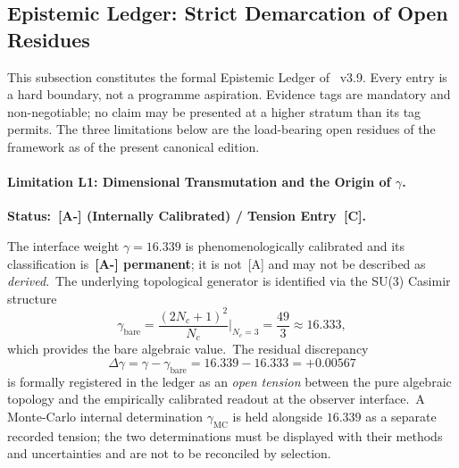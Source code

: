 
\subsection{Epistemic Ledger: Strict Demarcation of Open Residues}
\label{sec:epistemic_ledger}

\noindent This subsection constitutes the formal Epistemic Ledger of
\UIDT\ v3.9. Every entry is a hard boundary, not a programme aspiration.
Evidence tags are mandatory and non-negotiable; no claim may be presented
at a higher stratum than its tag permits. The three limitations below are
the load-bearing open residues of the framework as of the present
canonical edition.

\paragraph{Limitation L1: Dimensional Transmutation and the Origin
  of $\gamma$.}
\textbf{Status:~[A-] (Internally Calibrated) / Tension Entry~[C].}

The interface weight $\gamma = 16.339$ is phenomenologically calibrated
and its classification is~\textbf{[A-] permanent}; it is not~[A] and
may not be described as \emph{derived}.\Aminus\ The underlying
topological generator is identified via the SU(3) Casimir structure
\begin{equation}
  \gamma_{\text{bare}}
  = \frac{(2N_c+1)^2}{N_c}\bigg|_{N_c=3}
  = \frac{49}{3}
  \approx 16.333,
  \label{eq:gamma-bare}
\end{equation}
which provides the bare algebraic value.\Aminus\ The residual discrepancy
\begin{equation}
  \Delta\gamma = \gamma - \gamma_{\text{bare}}
  = 16.339 - 16.333 = +0.00567
  \label{eq:delta-gamma}
\end{equation}
is formally registered in the ledger as an \emph{open tension} between
the pure algebraic topology and the empirically calibrated readout at the
observer interface.\Cminus\ A Monte-Carlo internal determination
$\gamma_{\text{MC}}$ is held alongside $16.339$ as a separate recorded
tension; the two determinations must be displayed with their methods and
uncertainties and are not to be reconciled by selection.\Aminus

